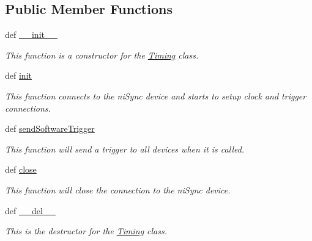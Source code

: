 \subsection*{Public Member Functions}
\begin{DoxyCompactItemize}
\item 
def \hyperlink{class_timing_1_1_timing_ac67aaac1d30dc11a6924a06c099f4fa1}{\-\_\-\-\_\-init\-\_\-\-\_\-}
\begin{DoxyCompactList}\small\item\em This function is a constructor for the \hyperlink{class_timing_1_1_timing}{Timing} class. \end{DoxyCompactList}\item 
def \hyperlink{class_timing_1_1_timing_a74750a56a2403b952fdd78e9d67f6b88}{init}
\begin{DoxyCompactList}\small\item\em This function connects to the ni\-Sync device and starts to setup clock and trigger connections. \end{DoxyCompactList}\item 
def \hyperlink{class_timing_1_1_timing_a464d13b21bd536d8332808cafb946725}{send\-Software\-Trigger}
\begin{DoxyCompactList}\small\item\em This function will send a trigger to all devices when it is called. \end{DoxyCompactList}\item 
def \hyperlink{class_timing_1_1_timing_a1d63d7de0f640dfac6b236a242d75d4d}{close}
\begin{DoxyCompactList}\small\item\em This function will close the connection to the ni\-Sync device. \end{DoxyCompactList}\item 
def \hyperlink{class_timing_1_1_timing_aa351ebd1126df7ce0711f2dd90f054be}{\-\_\-\-\_\-del\-\_\-\-\_\-}
\begin{DoxyCompactList}\small\item\em This is the destructor for the \hyperlink{class_timing_1_1_timing}{Timing} class. \end{DoxyCompactList}\end{DoxyCompactItemize}
